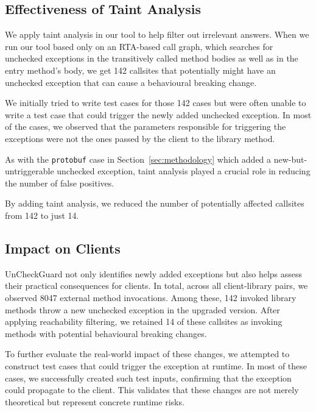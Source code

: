 \subsection{Effectiveness of Taint Analysis}

We apply taint analysis in our tool to help filter out irrelevant answers. When we run our tool based only on an RTA-based call graph, which
searches for unchecked exceptions in the transitively called method bodies as well as in the entry method's body, we get
142 callsites that potentially might have an unchecked exception that can cause a behavioural breaking change.

We initially tried to write test cases for those 142 cases but were often unable to write a test case that could trigger
the newly added unchecked exception. In most of the cases, we observed that the parameters responsible for triggering the 
exceptions were not the ones passed by the client to the library method.

As with the \texttt{protobuf} case in Section~\ref{sec:methodology} which added a new-but-untriggerable unchecked exception, taint analysis played a crucial role in reducing the number of false positives.

\vspace{1em}
\begin{tcolorbox}[colback=gray!10, colframe=black]
By adding taint analysis, we reduced the number of potentially affected callsites from 142 to just 14.
\end{tcolorbox}
\vspace{1em}

\subsection{Impact on Clients}

UnCheckGuard not only identifies newly added exceptions but also helps assess their practical consequences for clients. In total, across all client-library pairs, we observed 8047 external method invocations. Among these, 142 invoked library methods throw a new unchecked exception in the upgraded version. After applying reachability filtering, we retained 14 of these callsites as invoking methods with potential behavioural breaking changes. 

To further evaluate the real-world impact of these changes, we attempted to construct test cases that could trigger the exception at runtime. In most of these cases, we successfully created such test inputs, confirming that the exception could propagate to the client. This validates that these changes are not merely theoretical but represent concrete runtime risks.

